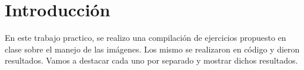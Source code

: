 \section{Introducción}
\label{intro}

	En este trabajo practico, se realizo una compilación de ejercicios propuesto en clase sobre el manejo de las imágenes. Los mismo se realizaron en código y dieron resultados. Vamos a destacar cada uno por separado y mostrar dichos resultados.